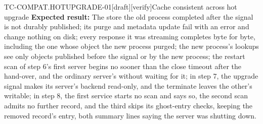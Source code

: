 \begin{requirement}{TC-COMPAT.HOTUPGRADE-01}[draft][verify]{Cache consistent across hot upgrade}
  \textbf{Expected result:} The store the old process completed after the
  signal is not durably published; its purge and metadata update fail with an
  error and change nothing on disk; every response it was streaming completes
  byte for byte, including the one whose object the new process purged; the
  new process's lookups see only objects published before the signal or by
  the new process; the restart scan of step 6's first server begins no
  sooner than the close timeout after the hand-over, and the ordinary
  server's without waiting for it; in step 7, the upgrade signal makes
  its server's backend read-only, and the terminate leaves the other's
  writable; in step 8, the first service starts no scan and says so, the
  second scan admits no further record, and the third skips its ghost-entry
  checks, keeping the removed record's entry, both summary lines saying the
  server was shutting down.



\end{requirement}


